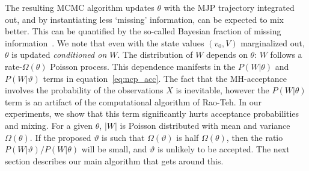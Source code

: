 \vspace{-.1in}
The resulting MCMC algorithm updates $\theta$ with the MJP trajectory 
integrated out, and by instantiating less `missing' information, can be expected to mix better. 
This can be quantified by the so-called Bayesian fraction of missing information~\citep{liu1994fraction, papaspiliopoulos2007general}. 
%
We note that even with the state values $(v_0,V)$ marginalized out, $\theta$ is updated {\em conditioned on $W$}. 
The distribution of $W$ depends on $\theta$: $W$ follows a rate-$\Omega(\theta)$ Poisson process. This dependence manifests in the $P(W|\theta)$ and $P(W|\vartheta)$ terms in equation~\eqref{eq:ncp_acc}. 
The fact that the MH-acceptance involves the probability of the observations  $X$ is inevitable, however the $P(W|\theta)$ term is an artifact of the computational algorithm of Rao-Teh. 
In our experiments, we show that this term significantly hurts acceptance probabilities and mixing. 
For a given $\theta$, $|W|$ is Poisson distributed with mean and variance $\Omega(\theta)$. 
If the proposed $\vartheta$ is such that $\Omega(\vartheta)$ is half $\Omega(\theta)$, then the ratio $P(W|\vartheta)/P(W|\theta)$ will be small, and $\vartheta$ is unlikely to be accepted. 
The next section describes our main algorithm that gets around this.
